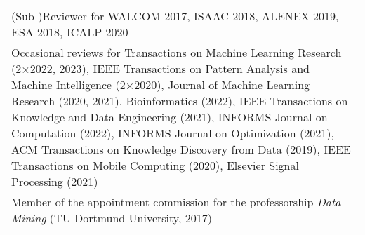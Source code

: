 \documentclass[10pt, a4paper, DIV=14, headings=small]{scrartcl}
\begin{document}
\begin{longtabu}{p{14.5cm}}
	(Sub-)Reviewer for WALCOM 2017, ISAAC 2018, ALENEX 2019, ESA 2018, ICALP 2020                                                                                                                                                                                                                                                                                                                                                                                                                                                                                                                                                                                                                                                                                                                                                                                                                 \\[2em]

	Occasional reviews for Transactions on Machine Learning Research (2$\times$2022, 2023), IEEE Transactions on Pattern Analysis and Machine Intelligence (2$\times$2020), Journal of Machine Learning Research (2020, 2021), Bioinformatics (2022), IEEE Transactions on Knowledge and Data Engineering (2021), INFORMS Journal on Computation (2022), INFORMS Journal on Optimization (2021), ACM Transactions on Knowledge Discovery from Data (2019), IEEE Transactions on Mobile Computing (2020), Elsevier Signal Processing (2021)                                                                                                                                                                                                                                                                                                                                                                         \\[7em]
	
	Member of the appointment commission for the professorship \emph{Data Mining} (TU Dortmund University, 2017)
\end{longtabu}
\end{document}

